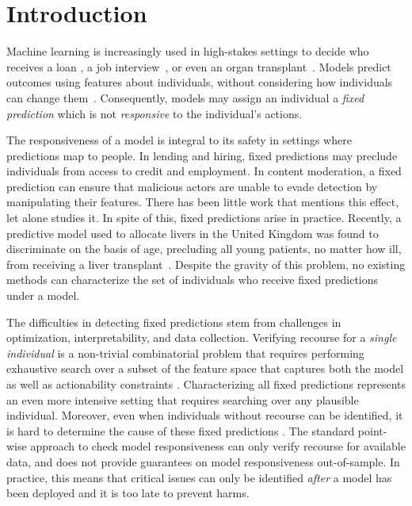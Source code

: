 \section{Introduction}

Machine learning is increasingly used in high-stakes settings to decide who receives a loan \citep{hurley2016credit}, a job interview~\citep{bogen2018help}, or even an organ transplant~\citep{murgia2023algorithms}. Models predict outcomes using features about individuals, without considering how individuals can change them~\citep[][]{liu2024actionability}. Consequently, models may assign an individual a \emph{fixed prediction} which is not \emph{responsive} to the individual's actions. 

The responsiveness of a model is integral to its safety in settings where predictions map to people. In lending and hiring, fixed predictions may preclude individuals from access to credit and employment. In content moderation, a fixed prediction can ensure that malicious actors are unable to evade detection by manipulating their features. There has been little work that mentions this effect, let alone studies it. In spite of this, fixed predictions arise in practice. Recently, a predictive model used to allocate livers in the United Kingdom was found to discriminate on the basis of age, precluding all young patients, no matter how ill, from receiving a liver transplant~\cite{murgia2023algorithms}. Despite the gravity of this problem, no existing methods can characterize the set of individuals who receive fixed predictions under a model.

The difficulties in detecting fixed predictions stem from challenges in optimization, interpretability, and data collection. Verifying recourse for a \emph{single individual} is a non-trivial combinatorial problem that requires performing exhaustive search over a subset of the feature space that captures both the model as well as actionability constraints \cite{ustun2019actionable, kothari2023prediction}. Characterizing all fixed predictions represents an even more intensive setting that requires searching over any plausible individual. Moreover, even when individuals without recourse can be identified, it is hard to determine the cause of these fixed predictions \citep{rawal2020algorithmic}. The standard point-wise approach to check model responsiveness \citep[see][]{kothari2023prediction} can only verify recourse for available data, and does not provide guarantees on model responsiveness out-of-sample. In practice, this means that critical issues can only be identified \emph{after} a model has been deployed and it is too late to prevent harms.  %

